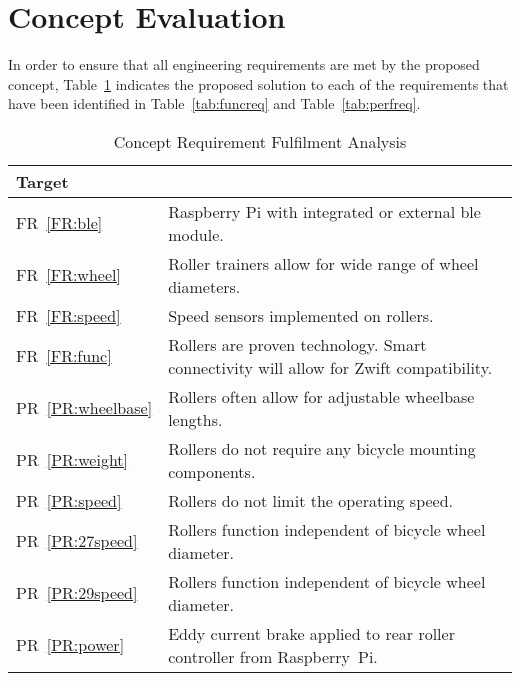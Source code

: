 \section{Concept Evaluation}
\label{sec:eval}

In order to ensure that all engineering requirements are met by the proposed concept, Table~\ref{tab:eval} indicates the proposed solution to each of the requirements that have been identified in Table~\ref{tab:funcreq} and Table~\ref{tab:perfreq}.

\begin{table}[H]
	\renewcommand{\arraystretch}{\tablestretch}
	\centering
	\caption{Concept Requirement Fulfilment Analysis}
	\begin{tabularx}{\textwidth}{p{2cm} >{\raggedright\arraybackslash}X}
		\toprule
		Target                & \multicolumn{1}{c}{Proposed Solution}                                                   \\
		\midrule
		FR~\ref{FR:ble}       & {Raspberry Pi with integrated or external \ac{ble} module.}                             \\
		FR~\ref{FR:wheel}     & {Roller trainers allow for wide range of wheel diameters.}                              \\
		FR~\ref{FR:speed}     & {Speed sensors implemented on rollers.}                                                 \\
		FR~\ref{FR:func}      & {Rollers are proven technology. Smart connectivity will allow for Zwift compatibility.} \\
		PR~\ref{PR:wheelbase} & {Rollers often allow for adjustable wheelbase lengths.}                                 \\
		PR~\ref{PR:weight}    & {Rollers do not require any bicycle mounting components.}                               \\
		PR~\ref{PR:speed}     & {Rollers do not limit the operating speed.}                                             \\
		PR~\ref{PR:27speed}   & {Rollers function independent of bicycle wheel diameter.}                               \\
		PR~\ref{PR:29speed}   & {Rollers function independent of bicycle wheel diameter.}                               \\
		PR~\ref{PR:power}     & {Eddy current brake applied to rear roller controller from Raspberry~Pi.}               \\
		\bottomrule
	\end{tabularx}
	\label{tab:eval}
\end{table}